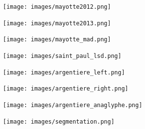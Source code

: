 \documentclass[8pt]{beamer}
\begin{document}
\vspace*{-6.5mm}
\begin{frame}[plain]
\hspace*{-11mm}
    \texttt{[image: images/mayotte2012.png]}
\end{frame}

\vspace*{-6.5mm}
\begin{frame}[plain]
\hspace*{-11mm}
    \texttt{[image: images/mayotte2013.png]}
\end{frame}

\vspace*{-6.5mm}
\begin{frame}[plain]
\hspace*{-11mm}
    \texttt{[image: images/mayotte\_mad.png]}
\end{frame}

\vspace*{-6.5mm}
\begin{frame}[plain]
\hspace*{-11mm}
\texttt{[image: images/saint\_paul\_lsd.png]}
\end{frame}

\vspace*{-6.5mm}
\begin{frame}[plain]
\hspace*{-11mm}
    \texttt{[image: images/argentiere\_left.png]}
\end{frame}

\vspace*{-6.5mm}
\begin{frame}[plain]
\hspace*{-11mm}
    \texttt{[image: images/argentiere\_right.png]}
\end{frame}

\vspace*{-6.5mm}
\begin{frame}[plain]
\hspace*{-11mm}
    \texttt{[image: images/argentiere\_anaglyphe.png]}
\end{frame}


\vspace*{-6.5mm}
\begin{frame}[plain]
\hspace*{-11mm}
    \texttt{[image: images/segmentation.png]}
\end{frame}
\end{document}
